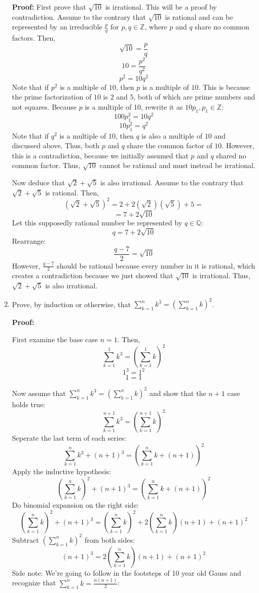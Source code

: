 \documentclass[11pt]{article}
\begin{document}
\begin{enumerate}
\bigskip 
\textbf{Proof: } First prove that $\sqrt{10}$ is irrational. This will be a proof by contradiction. Assume to the contrary that $\sqrt{10}$ is rational and can be represented by an irreducible $\frac{p}{q}$ for $p,q \in \mathbb{Z}$, where $p$ and $q$ share no common factors. Then, 
\[\sqrt{10} = \frac{p}{q} \]
\[10 = \frac{p^2}{q^2}\]
\[p^2 = 10q^2 \]
 Note that if $p^2$ is a multiple of $10$, then $p$ is a multiple of $10$. This is because the prime factorization of $10$ is $2$ and $5$, both of which are prime numbers and not squares. Because $p$ is a multiple of 10, rewrite it as $10p_1, p_1 \in \mathbb{Z}$: 
\[100p_1 ^2 = 10 q^2\]
\[10p_1^2 = q^2   \]
Note that if $q^2$ is a multiple of $10$, then $q$ is also a multiple of $10$ and discussed above. Thus, both $p$ and $q$ share the common factor of $10$.
However, this is a contradiction, because we initially assumed that $p$ and $q$ shared no common factor. Thus, $\sqrt{10}$ cannot be rational and must instead be irrational. 

Now deduce that $\sqrt{2} + \sqrt{5}$ is also irrational. Assume to the contrary that $\sqrt{2} + \sqrt{5}$ is rational. Then, 
\[(\sqrt{2} + \sqrt{5})^2  = 2 + 2(\sqrt{2})(\sqrt{5}) + 5 = \]
\[ = 7 + 2\sqrt{10}\]
Let this supposedly rational number be represented by $q \in \mathbb{Q}$:
\[q = 7 + 2\sqrt{10}\]
Rearrange:
\[\frac{q-7}{2} = \sqrt{10}\]
However, $\frac{q-7}{2}$ should be rational because every number in it is rational, which creates a contradiction because we just showed that $\sqrt{10}$ is irrational. Thus, $\sqrt{2} + \sqrt{5}$ is also irrational.

\bigskip
\rightline{$\Box$}
\item
Prove, by induction or otherwise, that $\sum_{k=1}^n k^3 = \left(\sum_{k=1}^n k\right)^2$.

\bigskip\textbf{Proof: }

First examine the base case $n = 1$. Then, 
\[ \sum_{k=1}^1 k^3 = \left(\sum_{k=1}^1 k\right)^2 \]
\[ 1^3 = 1^2\]
\[ 1= 1\]

Now assume that $\sum_{k=1}^n k^3 = \left(\sum_{k=1}^n k\right)^2$ and show that the $n+1$ case holds true: 
\[ \sum_{k=1}^{n+1} k^3 = \left(\sum_{k=1}^{n+1} k\right)^2 \]
Seperate the last term of each series:
\[ \sum_{k=1}^{n} k^3 + (n+1)^3 = \left(\sum_{k=1}^n k + (n+1)\right)^2\]
Apply the inductive hypothesis: 
\[ \left(\sum_{k=1}^n k\right)^2 + (n+1)^3 = \left(\sum_{k=1}^n k + (n+1)\right)^2\]
Do binomial expansion on the right side:
\[ \left(\sum_{k=1}^n k\right)^2 + (n+1)^3 = \left( \sum_{k=1}^n k\right)^2 + 2\left( \sum_{k=1}^{n} k\right)(n+1) + (n+1)^2\]
Subtract $\left(\sum_{k=1}^n k\right)^2$ from both sides:
\[ (n+1)^3 = 2\left( \sum_{k=1}^{n} k\right)(n+1) + (n+1)^2\]
Side note: We're going to follow in the footsteps of 10 year old Gauss and recognize that $\sum_{k=1}^{n} k = \frac{n(n+1)}{2}$:


\end{enumerate}
\end{document}
